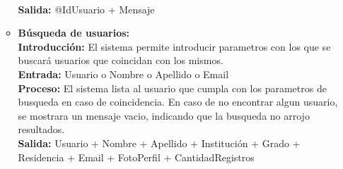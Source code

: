 \begin{enumerate}[A.]
\begin{itemize}
            \\ \textbf{Salida:} @IdUsuario + Mensaje
            \\
          \item \textbf{Búsqueda de usuarios:}
            \\ \textbf{Introducción:} El sistema permite introducir parametros con los que se buscará usuarios que coincidan con los mismos.
            \\ \textbf{Entrada:} Usuario o Nombre o Apellido o Email
            \\ \textbf{Proceso:} El sistema lista al usuario que cumpla con los parametros de busqueda en caso de coincidencia. En caso de no encontrar algun usuario, se mostrara un mensaje vacio, indicando que la busqueda no arrojo resultados.
            \\ \textbf{Salida:} Usuario + Nombre + Apellido + Institución + Grado + Residencia + Email + FotoPerfil + CantidadRegistros
            \\
        \end{itemize}


\end{enumerate}
